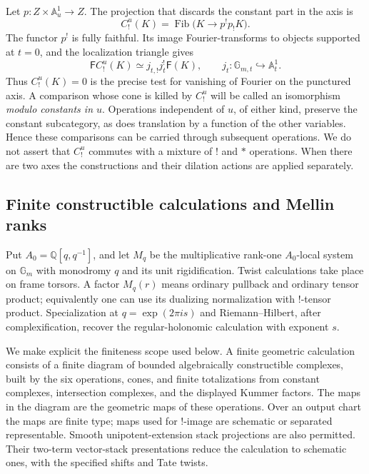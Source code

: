 \documentclass[11pt]{article}
\numberwithin{equation}{section}
\theoremstyle{definition}
\theoremstyle{remark}
\begin{document}
Let $p:Z\times\mathbb A^1_u\to Z$.  The projection that discards the
constant part in the axis is
\begin{equation}\label{eq:pre-axis-projection}
 C_!^u(K)=\operatorname{Fib}\bigl(K\longrightarrow p^!p_!K\bigr).
\end{equation}
The functor $p^!$ is fully faithful.  Its image Fourier-transforms to
objects supported at $t=0$, and the localization triangle gives
\[
 \mathsf F C_!^u(K)\simeq j_{t,!}j_t^!\mathsf F(K),
 \qquad j_t:\mathbb G_{m,t}\hookrightarrow\mathbb A^1_t.
\]
Thus $C_!^u(K)=0$ is the precise test for vanishing of Fourier on the
punctured axis.  A comparison whose cone is killed by $C_!^u$ will be
called an isomorphism \emph{modulo constants in $u$}.  Operations
independent of $u$, of either kind, preserve the constant subcategory,
as does translation by a function of the other variables.  Hence
these comparisons can be carried through subsequent operations.
We do not assert that $C_!^u$ commutes with a mixture of $!$ and $*$
operations.  When there are two axes the constructions and their
dilation actions are applied separately.

\subsection{Finite constructible calculations and Mellin ranks}

Put $A_0=\mathbb Q[q,q^{-1}]$, and let $M_q$ be the multiplicative
rank-one $A_0$-local system on $\mathbb G_m$ with monodromy $q$ and
its unit rigidification.  Twist calculations take place on frame
torsors.  A factor $M_q(r)$ means ordinary pullback and ordinary
tensor product; equivalently one can use its dualizing normalization
with $!$-tensor product.  Specialization at
$q=\exp(2\pi i s)$ and Riemann--Hilbert, after complexification,
recover the regular-holonomic calculation with exponent $s$.

We make explicit the finiteness scope used below.  A finite geometric
calculation consists of a finite diagram of bounded algebraically
constructible complexes, built by the six operations, cones, and
finite totalizations from constant complexes, intersection complexes,
and the displayed Kummer factors.  The maps in the diagram are the
geometric maps of these operations.  Over an output chart the maps
are finite type; maps used for $!$-image are schematic or separated
representable.  Smooth unipotent-extension stack projections are
also permitted.  Their two-term vector-stack presentations reduce
the calculation to schematic ones, with the specified shifts and
Tate twists.
\end{document}
